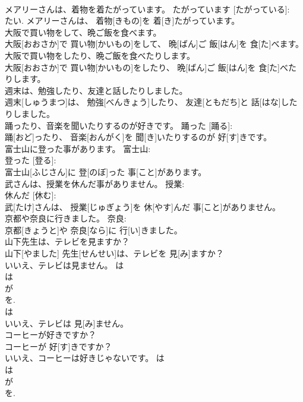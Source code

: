 \documentclass[8pt]{extreport}
\begin{document}
\begin{CJK}{UTF8}{min}
\\	メアリーさんは、着物を着たがっています。	たがっています [たがっている]: 
\\	たい.	メアリーさんは、 着物[きもの]を 着[き]たがっています。	
\\	大阪で買い物をして、晩ご飯を食べます。	
\\	大阪[おおさか]で 買い物[かいもの]をして、 晩[ばん]ご 飯[はん]を 食[た]べます。	
\\	大阪で買い物をしたり、晩ご飯を食べたりします。	
\\	大阪[おおさか]で 買い物[かいもの]をしたり、 晩[ばん]ご 飯[はん]を 食[た]べたりします。	
\\	週末は、勉強したり、友達と話したりしました。	
\\	週末[しゅうまつ]は、 勉強[べんきょう]したり、 友達[ともだち]と 話[はな]したりしました。	
\\	踊ったり、音楽を聞いたりするのが好きです。	踊った [踊る]: 
\\	踊[おど]ったり、 音楽[おんがく]を 聞[き]いたりするのが 好[す]きです。	
\\	富士山に登った事があります。	富士山: 
\\	登った [登る]: 
\\	富士山[ふじさん]に 登[のぼ]った 事[こと]があります。	
\\	武さんは、授業を休んだ事がありません。	授業: 
\\	休んだ [休む]: 
\\	武[たけ]さんは、 授業[じゅぎょう]を 休[やす]んだ 事[こと]がありません。	
\\	京都や奈良に行きました。	奈良: 
\\	京都[きょうと]や 奈良[なら]に 行[い]きました。	
\\	山下先生は、テレビを見ますか？	
\\	山下[やました] 先生[せんせい]は、テレビを 見[み]ますか？	
\\	いいえ、テレビは見ません。	は 
\\	は 
\\	が 
\\	を. 
\\	は 
\\	いいえ、テレビは 見[み]ません。	
\\	コーヒーが好きですか？	
\\	コーヒーが 好[す]きですか？	
\\	いいえ、コーヒーは好きじゃないです。	は 
\\	は 
\\	が 
\\	を. 

\end{CJK}
\end{document}
